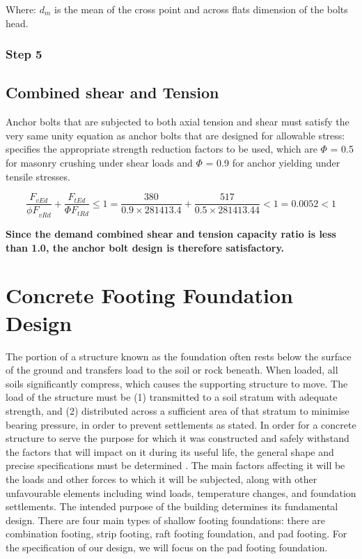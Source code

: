 { Where: \(d_m\) is the mean of the cross point and across flats dimension of the bolts head.
 

\subsubsection{\textbf{Step 5}}

\subsection{Combined shear and Tension}
Anchor bolts that are subjected to both axial tension and shear must satisfy the very same unity equation as anchor bolts that are designed for allowable stress:
\cite{NCMA2022} specifies the appropriate strength reduction factors to be used, which are \(\Phi\) = 0.5 for masonry crushing under shear loads and \(\Phi\) = 0.9 for anchor yielding under tensile stresses.


\begin{equation}
\frac{{ F}_{{vEd}}}{{\phi F}_{{vRd}}}+\frac{{F}_{{tEd}}}{\Phi{F}_{{tRd}}} \le{1}
= \frac{{380}}{{ 0.9 \times 281413}.{4}}+\frac{{517}}{{0}.{5}\times{281413}.{44}} <{1} = 0.0052 <{1}
\end{equation}

\textbf{Since the demand combined shear and tension capacity ratio is less than 1.0, the anchor bolt design is therefore satisfactory.}




\section{Concrete Footing Foundation Design}


The portion of a structure known as the foundation often rests below the surface of the ground and transfers load to the soil or rock beneath. When loaded, all soils significantly compress, which causes the supporting structure to move.
The load of the structure must be (1) transmitted to a soil stratum with adequate strength, and (2) distributed across a sufficient area of that stratum to minimise bearing pressure, in order to prevent settlements as stated.
In order for a concrete structure to serve the purpose for which it was constructed and safely withstand the factors that will impact on it during its useful life, the general shape and precise specifications must be determined \cite{darwin2016design}. The main factors affecting it will be the loads and other forces to which it will be subjected, along with other unfavourable elements including wind loads, temperature changes, and foundation settlements. The intended purpose of the building determines its fundamental design.
There are four main types of shallow footing foundations: there are combination footing, strip footing, raft footing foundation, and pad footing. For the specification of our design, we will focus on the pad footing foundation.

}
